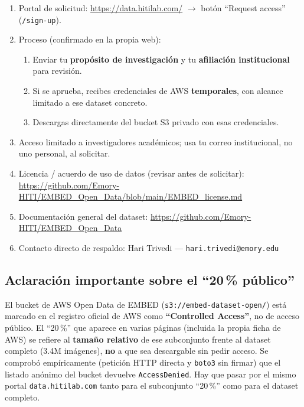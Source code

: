 \documentclass[11pt,a4paper]{article}
\begin{document}
\begin{enumerate}[leftmargin=1.2cm]
  \item Portal de solicitud: \url{https://data.hitilab.com/} $\to$ botón
        ``Request access'' (\texttt{/sign-up}).
  \item Proceso (confirmado en la propia web):
        \begin{enumerate}
          \item Enviar tu \textbf{propósito de investigación} y tu
                \textbf{afiliación institucional} para revisión.
          \item Si se aprueba, recibes credenciales de AWS \textbf{temporales},
                con alcance limitado a ese dataset concreto.
          \item Descargas directamente del bucket S3 privado con esas
                credenciales.
        \end{enumerate}
  \item Acceso limitado a investigadores académicos; usa tu correo
        institucional, no uno personal, al solicitar.
  \item Licencia / acuerdo de uso de datos (revisar antes de solicitar):
        \url{https://github.com/Emory-HITI/EMBED_Open_Data/blob/main/EMBED_license.md}
  \item Documentación general del dataset:
        \url{https://github.com/Emory-HITI/EMBED_Open_Data}
  \item Contacto directo de respaldo: Hari Trivedi ---
        \texttt{hari.trivedi@emory.edu}
\end{enumerate}

\subsection*{Aclaración importante sobre el ``20\,\% público''}
El bucket de AWS Open Data de EMBED (\texttt{s3://embed-dataset-open/})
está marcado en el registro oficial de AWS como \textbf{``Controlled
Access''}, no de acceso público. El ``20\,\%'' que aparece en varias
páginas (incluida la propia ficha de AWS) se refiere al \textbf{tamaño
relativo} de ese subconjunto frente al dataset completo (3.4M imágenes),
\textbf{no} a que sea descargable sin pedir acceso. Se comprobó
empíricamente (petición HTTP directa y \texttt{boto3} sin firmar) que el
listado anónimo del bucket devuelve \texttt{AccessDenied}. Hay que pasar
por el mismo portal \texttt{data.hitilab.com} tanto para el subconjunto
``20\,\%'' como para el dataset completo.
\end{document}
